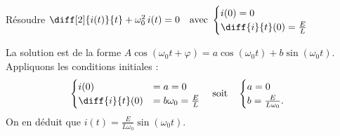 


\begin{enonce}
Résoudre $\diff[2]{i(t)}{t} + \omega_0^2 \, i(t) = 0\quad\text{avec }
\begin{cases}
i(0) = 0 \\
\diff{i}{t}(0) = \frac{E}{L}
\end{cases}$
\end{enonce}


\begin{corrige}
La solution est de la forme $A\cos(\omega_0t+\varphi)=a\cos(\omega_0t)+b\sin(\omega_0t)$. Appliquons les conditions initiales :
\[
\begin{cases}
i(0) 	&=a=0\\
\diff{i}{t}(0)  &=b\omega_0=\frac{E}{L}
\end{cases}
\quad\text{soit}\quad
\begin{cases}
a =0\\
b =\frac{E}{L\omega_0}.
\end{cases}
\]
On en déduit que $i(t) =\frac{E}{L\omega_0}\sin(\omega_0 t)$.
\end{corrige}



\finEntrainement






\hauteurLargeurCadreReponse		{6mm}{2.5cm}
\initialisationEntrainement

